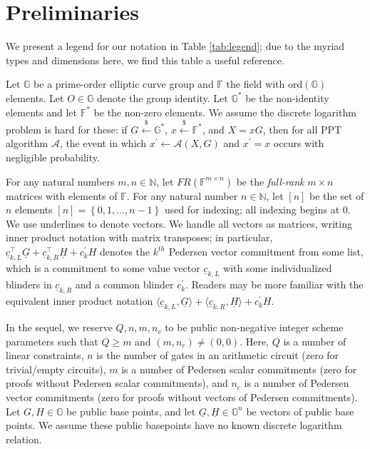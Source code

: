 \documentclass{article}
\theoremstyle{definition}
\newcommand{\samp}{\mathrel{\overset{\$}{\leftarrow}}}
\newcommand{\GG}{\mathbb{G}}
\newcommand{\FF}{\mathbb{F}}
\begin{document}
\section{Preliminaries}


We present a legend for our notation in Table \ref{tab:legend}; due to the myriad types and dimensions here, we find this table a useful reference.

Let $\GG$ be a prime-order elliptic curve group and $\FF$ the field with $\text{ord}(\GG)$ elements. Let $O \in \GG$ denote the group identity. Let $\GG^*$ be the non-identity elements and let $\FF^*$ be the non-zero elements. We assume the discrete logarithm problem is hard for these: if $G \samp \GG^*$, $x \samp \FF^*$, and $X = xG$, then for all PPT algorithm $\mathcal{A}$, the event in which $x^\prime \leftarrow \mathcal{A}(X,G)$ and $x^\prime = x$ occurs with negligible probability.


For any natural numbers $m,n \in \mathbb{N}$, let $FR(\FF^{m \times n})$ be the \textit{full-rank} $m\times n$ matrices with elements of $\FF$. 
For any natural number $n \in \mathbb{N}$, let $[n]$ be the set of $n$ elements $[n] = \left\{0, 1, \ldots, n-1\right\}$ used for indexing; all indexing begins at $0$. We use underlines to denote vectors. We handle all vectors as matrices, writing inner product notation with matrix transposes; in particular, $\underline{c}_{k,L}^\top \underline{G} + \underline{c}_{k,R}^\top \underline{H} + c^\prime_k H$ denotes the $k^{th}$ Pedersen vector commitment from some list, which is a commitment to some value vector $\underline{c}_{k,L}$ with some individualized blinders in $\underline{c}_{k,R}$ and a common blinder $c^\prime_k$. Readers may be more familiar with the equivalent inner product notation $\langle \underline{c}_{k,L}, \underline{G}\rangle + \langle \underline{c}_{k,R}, \underline{H} \rangle + c^\prime_k H$. 



In the sequel, we reserve $Q, n, m,  n_c$ to be public non-negative integer scheme parameters such that $Q \geq m$ and $(m,n_c) \neq (0,0)$. Here, $Q$ is a number of linear constraints, $n$ is the number of gates in an arithmetic circuit (zero for trivial/empty circuits), $m$ is a number of Pedersen scalar commitments (zero for proofs without Pedersen scalar commitments), and  $n_c$ is a number of Pedersen vector commitments (zero for proofs without vectors of Pedersen commitments).  
Let $G, H \in \GG$ be public base points, and let $\underline{G}, \underline{H} \in \GG^n$ be vectors of public base points. We assume these public basepoints have no known discrete logarithm relation.
\end{document}
